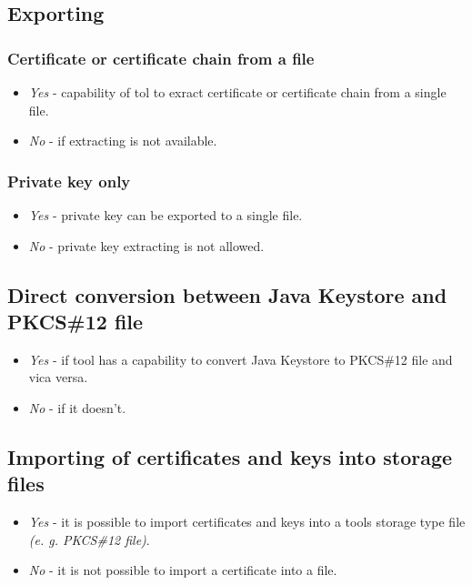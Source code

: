 \documentclass[10pt, a4paper]{report}
\begin{document}


\subsection{Exporting}

\subsubsection{Certificate or certificate chain from a file}
\begin{itemize}
 \item \textit{Yes} - capability of tol to exract certificate or certificate chain from a single file.
 \item \textit{No} - if extracting is not available.
\end{itemize}

\subsubsection{Private key only}

\begin{itemize}
 \item \textit{Yes} - private key can be exported to a single file.
 \item \textit{No} - private key extracting is not allowed.
\end{itemize}

\subsection{Direct conversion between Java Keystore and PKCS\#12 file}

\begin{itemize}
 \item \textit{Yes} - if tool has a capability to convert Java Keystore to PKCS\#12 file and vica versa.
 \item \textit{No} - if it doesn't.
\end{itemize}

\subsection{Importing of certificates and keys into storage files}

\begin{itemize}
 \item \textit{Yes} - it is possible to import certificates and keys into a tools storage type file \textit{(e. g. PKCS\#12 file)}.
 \item \textit{No} - it is not possible to import a certificate into a file.
\end{itemize}
\end{document}

